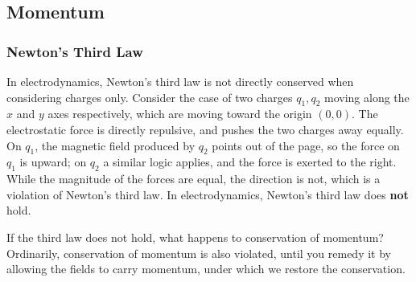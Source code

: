 \documentclass[10pt]{article}
\begin{document}
	\subsection{Momentum}
	\subsubsection{Newton's Third Law}
	In electrodynamics, Newton's third law is not directly conserved when considering charges only. Consider
	the case of two charges \( q_1, q_2 \) moving along the \( x \) and \( y \) axes respectively, 
	which are moving toward the origin \((0, 0)\). The electrostatic force is directly repulsive, and pushes
	the two charges away equally. On \( q_1 \), the magnetic field produced by \( q_2 \) points out of the
	page, so the force on \( q_1 \) is upward; on \( q_2 \) a similar logic applies, and the force is exerted
	to the right. While the magnitude of the forces are equal, the direction is not, which is a violation of
	Newton's third law. In electrodynamics, Newton's third law does \textbf{not} hold.   

	If the third law does not hold, what happens to conservation of momentum? Ordinarily, conservation of
	momentum is also violated, until you remedy it by allowing the fields to carry momentum, under which we
	restore the conservation.    
\end{document}

